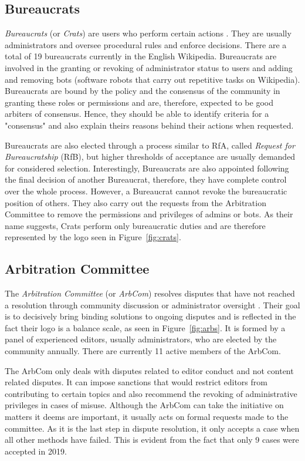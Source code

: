 \subsection{Bureaucrats}
\textit{Bureaucrats} (or \textit{Crats}) are users who perform certain actions \cite{wiki:bureaucrats}.
They are usually administrators and oversee procedural rules and enforce decisions.
There are a total of 19 bureaucrats currently in the English Wikipedia.
Bureaucrats are involved in the granting or revoking of administrator status to users and adding and removing bots (software robots that carry out repetitive tasks on Wikipedia).
Bureaucrats are bound by the policy and the consensus of the community in granting these roles or permissions and are, therefore, expected to be good arbiters of consensus.
Hence, they should be able to identify criteria for a "consensus" and also explain theirs reasons behind their actions when requested. 

Bureaucrats are also elected through a process similar to RfA, called \textit{Request for Bureaucratship} (RfB), but higher thresholds of acceptance are usually demanded for considered selection.
Interestingly, Bureaucrats are also appointed following the final decision of another Bureaucrat, therefore, they have complete control over the whole process.
However, a Bureaucrat cannot revoke the bureaucratic position of others.
They also carry out the requests from the Arbitration Committee to remove the permissions and privileges of admins or bots.
As their name suggests, Crats perform only bureaucratic duties and are therefore represented by the logo seen in Figure~\ref{fig:crats}.

\subsection{Arbitration Committee}
The \textit{Arbitration Committee} (or \textit{ArbCom}) resolves disputes that have not reached a resolution through community discussion or administrator oversight \cite{wiki:arbcom}.
Their goal is to decisively bring binding solutions to ongoing disputes and is reflected in the fact their logo is a balance scale, as seen in Figure~\ref{fig:arbs}.
It is formed by a panel of experienced editors, usually administrators, who are elected by the community annually.
There are currently 11 active members of the ArbCom.

The ArbCom only deals with disputes related to editor conduct and not content related disputes.
It can impose sanctions that would restrict editors from contributing to certain topics and also recommend the revoking of administrative privileges in cases of misuse.
Although the ArbCom can take the initiative on matters it deems are important, it usually acts on formal requests made to the committee.
As it is the last step in dispute resolution, it only accepts a case when all other methods have failed.
This is evident from the fact that only 9 cases were accepted in 2019. 

